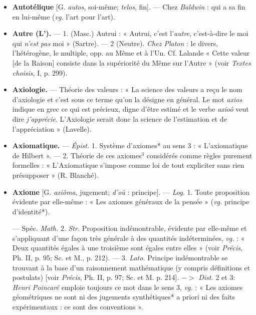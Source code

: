 \begin{itemize}[leftmargin=1cm, label=, itemsep=1pt]
\item {\bf Autotélique} [G. {\it autos}, soi-même; {\it telos},
fin]. — Chez {\it Baldwin} : qui a sa fin
en lui-même ({\it vg.} l’art pour l’art).

\item {\bf Autre (L').} — 1. (Masc.) Autrui :
« Autrui, c’est l’{\it autre}, c’est-à-dire
le moi qui {\it n’est pas} moi » (Sartre). —
2 (Neutre). {\it Chez Platon} : le divers,
l’hétérogène, le multiple, opp. au
Même et à l’Un. Cf. Lalande
« Cette valeur [de la Raison] consiste
dans la supériorité du Même sur
l'Autre » (voir {\it Textes choisis}, I,
p. 299).

\item {\bf Axiologie.} — Théorie des valeurs : « La
science des valeurs a reçu le nom
d’axiologie et c'est sous ce terme
qu’on la désigne en général. Le mot
{\it axios} indique en grec ce qui est précieux, digne d'être estimé et le
verbe {\it axioô} veut dire {\it j'apprécie}.
L’Axiologie serait donc la science
de l’estimation et de l’appréciation »
(Lavelle).

\item {\bf Axiomatique.} — \textsf{\textit {Épist.}} 1. Système
d’axiomes* au sens 3 : « L’axiomatique de Hilbert ». — 2. Théorie de
ces axiomes$^3$ considérés comme
règles purement formelles : « L’Axiomatique s'impose comme loi de tout
expliciter sans rien présupposer »
(R. Blanché).

\item {\bf Axiome} [G. {\it axiôma}, jugement; {\it d'où} :
principe]. — \textsf{\textit {Log.}} 1. Toute proposition évidente par elle-même : « Les
axiomes généraux de la pensée » ({\it vg.}
principe d’identité*).

— Spéc. \textsf{\textit {Math.}} 2. {\it Str.} Proposition indémontrable, évidente par
elle-même et s'appliquant d’une
façon très générale à des quantités
indéterminées, {\it vg.} : « Deux quantités
égales à une troisième sont égales
entre elles » (voir {\it Précis}, Ph. II,
p. 95; Sc. et M., p. 212). — 3. {\it Lato.}
Principe indémontrable se trouvant
à la base d’un raisonnement mathématique (y compris définitions et
postulats) [voir {\it Précis}, Ph. II, p. 97;
Sc. et M. p. 214]. $->$ {\it Dist.} 2 et 3:
{\it Henri Poincaré} emploie toujours
ce mot dans le sens 3, {\it vg.} : « Les
axiomes géométriques ne sont ni des
jugements synthétiques* a priori ni
des faits expérimentaux : ce sont
des conventions ».
	\end{itemize}
